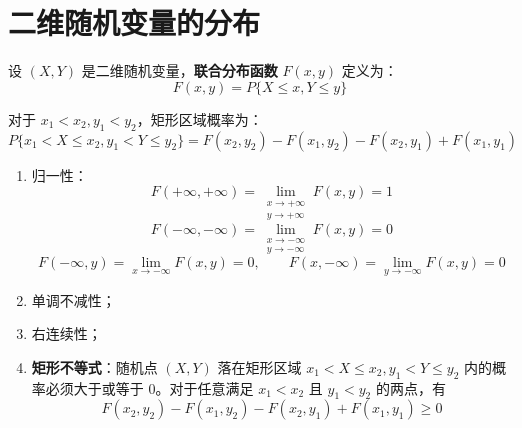 \section{二维随机变量的分布}
\begin{definition}[联合分布函数]
设 $(X, Y)$ 是二维随机变量，\textbf{联合分布函数} $F(x, y)$ 定义为：
\begin{equation}
	F(x, y) = P\{X \le x, Y \le y\}
	\label{eq:第三章:联合分布函数}
\end{equation}
\end{definition}

\begin{theorem}[矩形区域概率公式]
对于 $x_1 < x_2, y_1 < y_2$，矩形区域概率为：
\begin{equation}
	P\{x_1 < X \le x_2, y_1 < Y \le y_2\} = F(x_2, y_2) - F(x_1, y_2) - F(x_2, y_1) + F(x_1, y_1)
	\label{eq:第三章:矩形区域概率}
\end{equation}
\end{theorem}

\begin{property}[联合分布函数的性质]
\begin{enumerate}
	\item 归一性：
	\begin{equation}
		F(+\infty, +\infty) = \lim_{\substack{x \to +\infty \\ y \to +\infty}} F(x, y) = 1
		\label{eq:第三章:归一性1}
	\end{equation}
	\begin{equation}
		F(-\infty, -\infty) = \lim_{\substack{x \to -\infty \\ y \to -\infty}} F(x, y) = 0
		\label{eq:第三章:归一性2}
	\end{equation}
	\begin{equation}
		F(-\infty, y) = \lim_{x \to -\infty} F(x, y) = 0, \qquad F(x, -\infty) = \lim_{y \to -\infty} F(x, y) = 0
		\label{eq:第三章:归一性3}
	\end{equation}
	\item 单调不减性；
	\item 右连续性；
	\item \textbf{矩形不等式}：随机点 $(X, Y)$ 落在矩形区域 $x_1 < X \le x_2, y_1 < Y \le y_2$ 内的概率必须大于或等于 0。对于任意满足 $x_1 < x_2$ 且 $y_1 < y_2$ 的两点，有
	\begin{equation}
		F(x_2, y_2) - F(x_1, y_2) - F(x_2, y_1) + F(x_1, y_1) \ge 0
		\label{eq:第三章:矩形不等式}
	\end{equation}
\end{enumerate}
\end{property}

